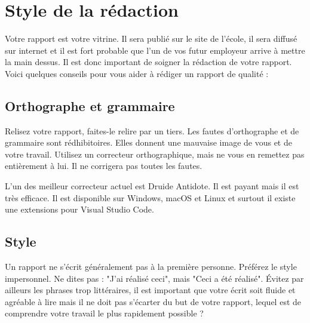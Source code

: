 \section{Style de la rédaction}

Votre rapport est votre vitrine. Il sera publié sur le site de l'école, il sera diffusé sur internet et il est fort probable que l'un de vos futur employeur arrive à mettre la main dessus. Il est donc important de soigner la rédaction de votre rapport. Voici quelques conseils pour vous aider à rédiger un rapport de qualité :

\subsection{Orthographe et grammaire}

Relisez votre rapport, faites-le relire par un tiers. Les fautes d'orthographe et de grammaire sont rédhibitoires. Elles donnent une mauvaise image de vous et de votre travail. Utilisez un correcteur orthographique, mais ne vous en remettez pas entièrement à lui. Il ne corrigera pas toutes les fautes.

L'un des meilleur correcteur actuel est Druide Antidote. Il est payant mais il est très efficace. Il est disponible sur Windows, macOS et Linux et surtout il existe une extensions pour Visual Studio Code.

\subsection{Style}

Un rapport ne s'écrit généralement pas à la première personne. Préférez le style impersonnel. Ne dites pas : "J'ai réalisé ceci", mais "Ceci a été réalisé". Évitez par ailleurs les phrases trop littéraires, il est important que votre écrit soit fluide et agréable à lire mais il ne doit pas s'écarter du but de votre rapport, lequel est de comprendre votre travail le plus rapidement possible ?